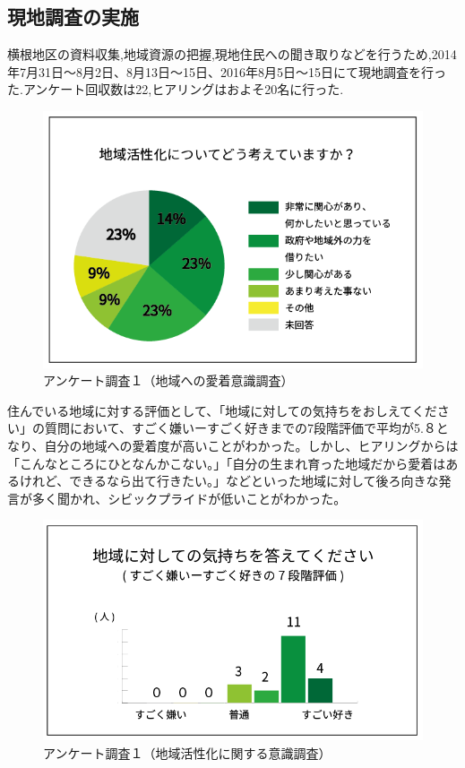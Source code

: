 \documentclass[a4paper]{jsarticle}
\begin{document}
\subsection{現地調査の実施}
横根地区の資料収集,地域資源の把握,現地住民への聞き取りなどを行うため,2014年7月31日〜8月2日、8月13日〜15日、2016年8月5日〜15日にて現地調査を行った.アンケート回収数は22,ヒアリングはおよそ20名に行った.\par

\begin{figure}[h]
  \begin{center}
    \includegraphics[width=0.95\hsize]{./images/02}
    \caption{アンケート調査１（地域への愛着意識調査）}
    \label{fig:tmu_hino}
  \end{center}
\end{figure}

住んでいる地域に対する評価として、「地域に対しての気持ちをおしえてください」の質問において、すごく嫌いーすごく好きまでの7段階評価で平均が5.８となり、自分の地域への愛着度が高いことがわかった。しかし、ヒアリングからは「こんなところにひとなんかこない。」「自分の生まれ育った地域だから愛着はあるけれど、できるなら出て行きたい。」などといった地域に対して後ろ向きな発言が多く聞かれ、シビックプライドが低いことがわかった。\par
\begin{figure}[h]
  \begin{center}
    \includegraphics[width=0.95\hsize]{./images/03}
    \caption{アンケート調査１（地域活性化に関する意識調査）}
    \label{fig:tmu_hino}
  \end{center}
\end{figure}
\end{document}
